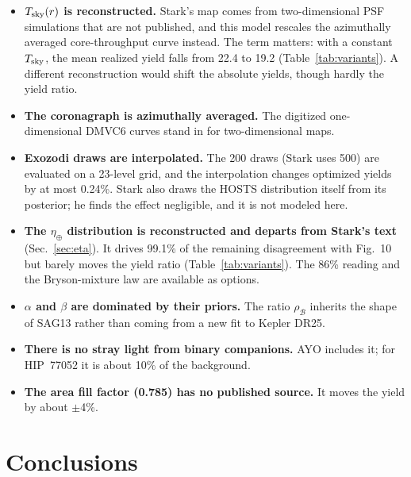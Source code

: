 \documentclass[11pt,a4paper]{article}
\begin{document}
\begin{itemize}
\item \textbf{$T_{\rm sky}(r)$ is reconstructed.} Stark's map comes from two-dimensional PSF
simulations that are not published, and this model rescales the azimuthally averaged
core-throughput curve instead. The term matters: with a constant $T_{\rm sky}$, the mean realized
yield falls from 22.4 to 19.2 (Table~\ref{tab:variants}). A different
reconstruction would shift the absolute yields, though hardly the yield ratio.
\item \textbf{The coronagraph is azimuthally averaged.} The digitized one-dimensional DMVC6 curves
stand in for two-dimensional maps.
\item \textbf{Exozodi draws are interpolated.} The 200 draws (Stark uses 500) are evaluated
on a 23-level grid, and the interpolation changes optimized yields by at most 0.24\%.
Stark also draws the HOSTS distribution itself from its posterior; he finds the effect negligible,
and it is not modeled here.
\item \textbf{The $\eta_\oplus$ distribution is reconstructed and departs from Stark's text}
(Sec.~\ref{sec:eta}). It drives 99.1\% of the remaining disagreement with Fig.~10 but
barely moves the yield ratio (Table~\ref{tab:variants}). The 86\% reading and the Bryson-mixture
law are available as options.
\item \textbf{$\alpha$ and $\beta$ are dominated by their priors.} The ratio $\rho_\mathcal{B}$
inherits the shape of SAG13 rather than coming from a new fit to Kepler DR25.
\item \textbf{There is no stray light from binary companions.} AYO includes it; for HIP~77052 it is
about 10\% of the background.
\item \textbf{The area fill factor (0.785) has no published source.} It moves the yield by about
$\pm$4\%.
\end{itemize}

\section{Conclusions}
\end{document}
